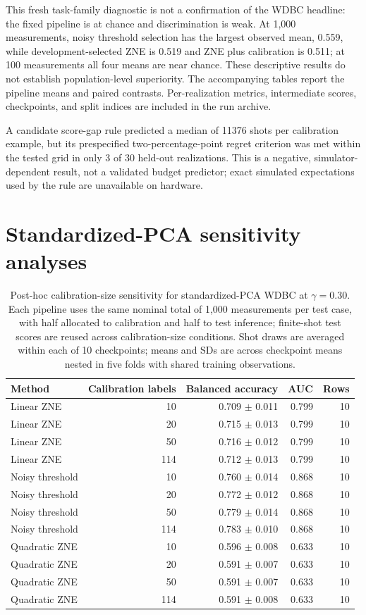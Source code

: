 \documentclass[10pt]{article}
\begin{document}
This fresh task-family diagnostic is not a confirmation of the WDBC headline: the fixed pipeline is at chance and discrimination is weak. At 1,000 measurements, noisy threshold selection has the largest observed mean, 0.559, while development-selected ZNE is 0.519 and ZNE plus calibration is 0.511; at 100 measurements all four means are near chance. These descriptive results do not establish population-level superiority. The accompanying tables report the pipeline means and paired contrasts. Per-realization metrics, intermediate scores, checkpoints, and split indices are included in the run archive.

A candidate score-gap rule predicted a median of 11376 shots per calibration example, but its prespecified two-percentage-point regret criterion was met within the tested grid in only 3 of 30 held-out realizations. This is a negative, simulator-dependent result, not a validated budget predictor; exact simulated expectations used by the rule are unavailable on hardware.

\clearpage
\section*{Standardized-PCA sensitivity analyses}

\begin{table}[t]\centering\scriptsize
\caption{Post-hoc calibration-size sensitivity for standardized-PCA WDBC at $\gamma=0.30$. Each pipeline uses the same nominal total of 1,000 measurements per test case, with half allocated to calibration and half to test inference; finite-shot test scores are reused across calibration-size conditions. Shot draws are averaged within each of 10 checkpoints; means and SDs are across checkpoint means nested in five folds with shared training observations.}
\label{tab:calsize}
\begin{tabular}{@{}l r r r r@{}}\toprule
Method & Calibration labels & Balanced accuracy & AUC & Rows \\ \midrule
Linear ZNE & 10 & 0.709 $\pm$ 0.011 & 0.799 & 10 \\
Linear ZNE & 20 & 0.715 $\pm$ 0.013 & 0.799 & 10 \\
Linear ZNE & 50 & 0.716 $\pm$ 0.012 & 0.799 & 10 \\
Linear ZNE & 114 & 0.712 $\pm$ 0.013 & 0.799 & 10 \\
Noisy threshold & 10 & 0.760 $\pm$ 0.014 & 0.868 & 10 \\
Noisy threshold & 20 & 0.772 $\pm$ 0.012 & 0.868 & 10 \\
Noisy threshold & 50 & 0.779 $\pm$ 0.014 & 0.868 & 10 \\
Noisy threshold & 114 & 0.783 $\pm$ 0.010 & 0.868 & 10 \\
Quadratic ZNE & 10 & 0.596 $\pm$ 0.008 & 0.633 & 10 \\
Quadratic ZNE & 20 & 0.591 $\pm$ 0.007 & 0.633 & 10 \\
Quadratic ZNE & 50 & 0.591 $\pm$ 0.007 & 0.633 & 10 \\
Quadratic ZNE & 114 & 0.591 $\pm$ 0.008 & 0.633 & 10 \\
\bottomrule\end{tabular}\end{table}
\end{document}
